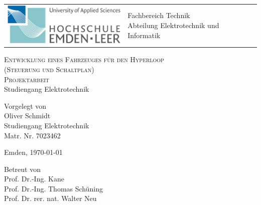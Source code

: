\begin{titlepage}

	\vspace{-0.5cm}
	\hspace{-3.0cm}
	\begin{tabular}{p{8.0cm} p{8.0cm}}
		\includegraphics[width = 6.0cm]{img/GUI/hsel-allgemein} &
		\parbox[b]{8.0cm}{
		{\large 	Fachbereich Technik }                            \\
		{\large 	Abteilung Elektrotechnik und Informatik }
		}                                                         \\
		\\
		\hline
	\end{tabular}
	\begin{center}

		\vspace{2.5cm}
		\LARGE{\textsc{
				Entwicklung eines Fahrzeuges für den Hyperloop\\
				(Steuerung und Schaltplan)
			}}\\

		\vspace{2cm}
		\LARGE{\textsc{
				{Projektarbeit}
			}}\\
		\large
		Studiengang Elektrotechnik

		\vspace{2cm}
		\large
		Vorgelegt von\\ Oliver Schmidt\\ Studiengang Elektrotechnik\\ Matr. Nr. 7023462

		\vspace{1cm}
		Emden, \today

		\vspace{2.5cm}
		Betreut von\\ Prof. Dr.-Ing. Kane \\ Prof. Dr.-Ing. Thomas Schüning \\ Prof. Dr. rer. nat. Walter Neu

	\end{center}
	\normalsize
\end{titlepage}
